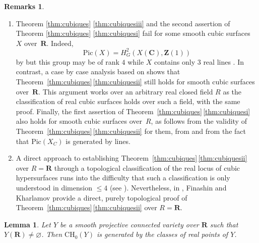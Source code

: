 \documentclass[JEP,XML,SOM,Unicode]{cedram}
\theoremstyle{plain}
\newtheorem{lem}[thm]{Lemma}
\theoremstyle{definition}
\newtheorem{rmks}[thm]{Remarks}
\numberwithin{equation}{section}
\renewcommand{\C}{{\mathbf C}}
\newcommand{\R}{{\mathbf R}}
\newcommand{\Z}{{\mathbf Z}}
\newcommand{\CH}{\mathrm{CH}}
\newcommand{\Pic}{\mathrm{Pic}}
\renewcommand{\emptyset}{\varnothing}
\begin{document}
\skpt
\begin{rmks}
\begin{enumerate}
\item
Theorem \ref{thm:cubiques} \eqref{thm:cubiquesiii} and the second assertion of Theorem \ref{thm:cubiques} \eqref{thm:cubiquesi} fail for some smooth cubic surfaces $X$ over~$\R$. Indeed,
\[
\Pic(X)=H^2_G(X(\C),\Z(1))
\]
by \cite[Prop.\,\ref*{BW1-prop:real(1,1)}]{BW1} but this group may be of rank $4$ while $X$ contains only $3$ real lines \cite[Ch.\,VI,~(5.4.4)]{silhol}. In contrast, a case by case analysis based on \cite[Ch.\,VI,~(5.4)]{silhol} shows that Theorem~\ref{thm:cubiques}\,\eqref{thm:cubiquesii} still holds for smooth cubic surfaces over~$\R$. This argument works over an arbitrary real closed field $R$ as the classification \cite[Ch.\,VI,~(5.4)]{silhol} of real cubic surfaces holds over such a field, with the same proof.
Finally, the first assertion of Theorem~\ref{thm:cubiques}\,\eqref{thm:cubiquesi} also holds
for smooth cubic surfaces over~$R$, as follows from the validity of
Theorem~\ref{thm:cubiques}\,\eqref{thm:cubiquesii} for them, from
\cite[Prop.\,\ref*{BW1-prop:conoyau norme}]{BW1}
and from the fact that $\Pic(X_C)$ is generated by lines.

\item
A direct approach to establishing Theorem~\ref{thm:cubiques}\,\eqref{thm:cubiquesii} over $R=\R$
through a topological classification of the real locus
of cubic hypersurfaces runs into the difficulty that
such a classification is only understood in dimension $\leq 4$ (see \cite{KharlaFin}).
Nevertheless,
in \cite{slavasergei},
Finashin and Kharlamov provide a direct, purely topological proof of Theorem~\ref{thm:cubiques}\,\eqref{thm:cubiquesii} over $R=\R$.
\end{enumerate}
\end{rmks}

\begin{lem}
\label{lem:CH0pointsreels}
Let $Y$ be a smooth projective connected variety over $\R$ such that $Y(\R)\neq\emptyset$. Then $\CH_0(Y)$ is generated by the classes of real points of $Y$.
\end{lem}
\end{document}
